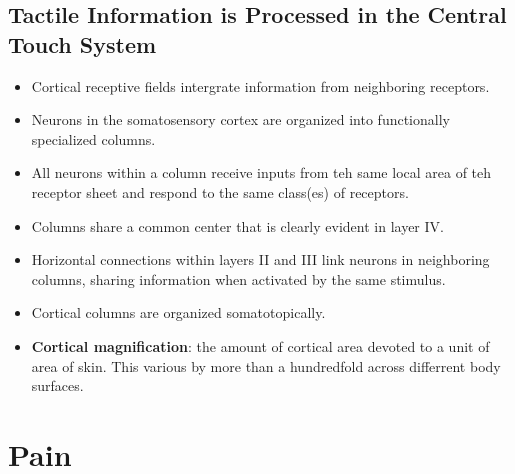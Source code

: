 \documentclass[12pt,a4paper]{article}
\begin{document}
\subsection{Tactile Information is Processed in the Central Touch System}
\begin{itemize}
    \item Cortical receptive fields intergrate information from neighboring receptors.
    \item Neurons in the somatosensory cortex are organized into functionally specialized columns.
    \item All neurons within a column receive inputs from teh same local area of teh receptor sheet and respond to the same class(es) of receptors.
    \item Columns share a common center that is clearly evident in layer IV.
    \item Horizontal connections within layers II and III link neurons in neighboring columns, sharing information when activated by the same stimulus.
    \item Cortical columns are organized somatotopically.
    \item \textbf{Cortical magnification}: the amount of cortical area devoted to a unit of area of skin. This various by more than a hundredfold across differrent body surfaces.
\end{itemize}

\clearpage
\section{Pain}
\end{document}

